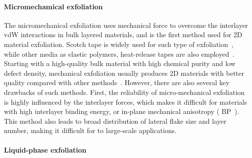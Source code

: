 \paragraph{Micro\-mechamical exfoliation}

The micro\-mechanical exfoliation uses mechanical force to overcome the
interlayer vdW interactions in bulk layered materials, and is the
first method used for 2D material exfoliation. Scotch tape is widely
used for such type of exfoliation~\autocite{Novoselov_2004_gr}, while
other media as elastic polymers, heat-release tapes are also
employed~\autocite{Favron_2015_BP_PDMS,Jain_2018_PDMS}. Starting with a high-quality bulk material with high chemical purity
and low defect density, mechanical exfoliation usually produces
2D materials with better quality compared with other
methods~\autocite{Lin_2019_gr_rev_growth}.
%
However, there are also several key drawbacks of such methods. First,
the reliability of micro-mechanical exfoliation is highly influenced
by the interlayer forces, which makes it difficult for materials with
high interlayer binding energy, or in-plane mechanical anisotropy
(\eg{} BP~\autocite{Favron_2015_BP_PDMS,Liu_2017_aniso_BP}). This
method also leads to broad distribution of lateral flake size and
layer number, making it difficult for to large-scale applications.

\paragraph{Liquid-phase exfoliation}

